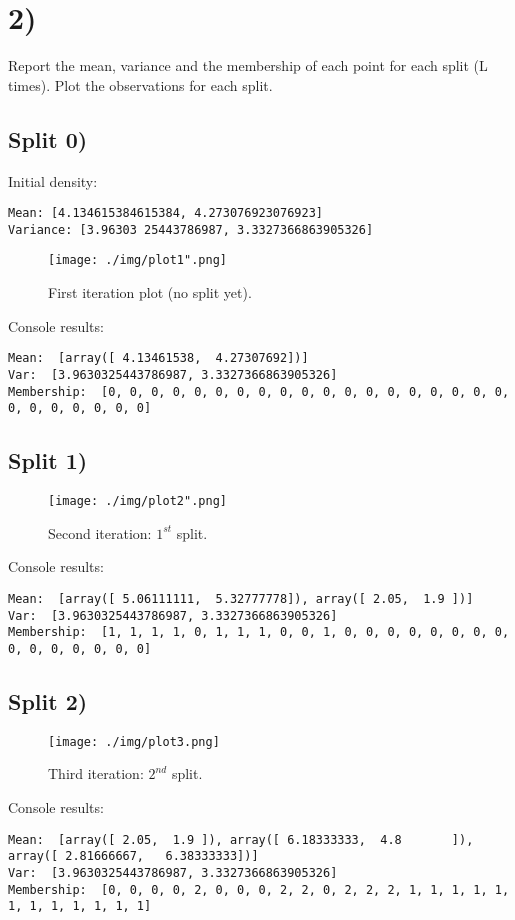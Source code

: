 \section*{2)} %
\label{sec:2}

Report the mean, variance and the membership of each point for each split (L times).
Plot the observations for each split.

\subsection*{Split 0)}
Initial density:
\begin{lstlisting}
Mean: [4.134615384615384, 4.273076923076923]
Variance: [3.96303 25443786987, 3.3327366863905326]
\end{lstlisting}

\begin{figure}[h!]
    \centering
    \texttt{[image: ./img/plot1".png]}
    \caption{First iteration plot (no split yet).}
    \label{fig:plot1}
\end{figure}
Console results:
\begin{lstlisting}
Mean:  [array([ 4.13461538,  4.27307692])]
Var:  [3.9630325443786987, 3.3327366863905326]
Membership:  [0, 0, 0, 0, 0, 0, 0, 0, 0, 0, 0, 0, 0, 0, 0, 0, 0, 0, 0, 0, 0, 0, 0, 0, 0, 0] 
\end{lstlisting}
\pagebreak 
\subsection*{Split 1)}
\label{subsection:Split 1}
\begin{figure}[h!]
    \centering
    \texttt{[image: ./img/plot2".png]}
    \caption{Second iteration: $1^{st}$ split.}
    \label{fig:plot2}
\end{figure}

Console results:
\begin{lstlisting}
Mean:  [array([ 5.06111111,  5.32777778]), array([ 2.05,  1.9 ])]
Var:  [3.9630325443786987, 3.3327366863905326]
Membership:  [1, 1, 1, 1, 0, 1, 1, 1, 0, 0, 1, 0, 0, 0, 0, 0, 0, 0, 0, 0, 0, 0, 0, 0, 0, 0]
\end{lstlisting}
\pagebreak 
\subsection*{Split 2)}
\label{subsection:Split 2}
\begin{figure}[h!]
    \centering
    \texttt{[image: ./img/plot3.png]}
    \caption{Third iteration: $2^{nd}$ split.}
    \label{fig:plot2}
\end{figure}
Console results:
\begin{lstlisting}
Mean:  [array([ 2.05,  1.9 ]), array([ 6.18333333,  4.8       ]), array([ 2.81666667,   6.38333333])]
Var:  [3.9630325443786987, 3.3327366863905326]
Membership:  [0, 0, 0, 0, 2, 0, 0, 0, 2, 2, 0, 2, 2, 2, 1, 1, 1, 1, 1, 1, 1, 1, 1, 1, 1, 1]
\end{lstlisting}
\pagebreak 
